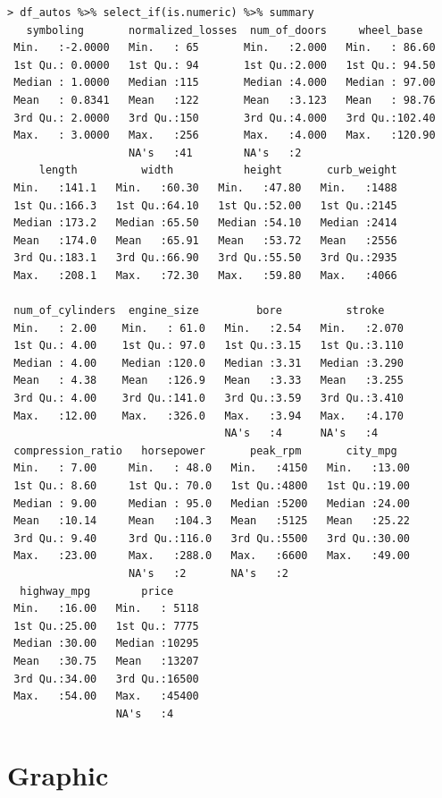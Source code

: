 \documentclass{article}
\begin{document}
\begin{lstlisting}
> df_autos %>% select_if(is.numeric) %>% summary
   symboling       normalized_losses  num_of_doors     wheel_base
 Min.   :-2.0000   Min.   : 65       Min.   :2.000   Min.   : 86.60
 1st Qu.: 0.0000   1st Qu.: 94       1st Qu.:2.000   1st Qu.: 94.50
 Median : 1.0000   Median :115       Median :4.000   Median : 97.00
 Mean   : 0.8341   Mean   :122       Mean   :3.123   Mean   : 98.76
 3rd Qu.: 2.0000   3rd Qu.:150       3rd Qu.:4.000   3rd Qu.:102.40
 Max.   : 3.0000   Max.   :256       Max.   :4.000   Max.   :120.90
                   NA's   :41        NA's   :2
     length          width           height       curb_weight
 Min.   :141.1   Min.   :60.30   Min.   :47.80   Min.   :1488
 1st Qu.:166.3   1st Qu.:64.10   1st Qu.:52.00   1st Qu.:2145
 Median :173.2   Median :65.50   Median :54.10   Median :2414
 Mean   :174.0   Mean   :65.91   Mean   :53.72   Mean   :2556
 3rd Qu.:183.1   3rd Qu.:66.90   3rd Qu.:55.50   3rd Qu.:2935
 Max.   :208.1   Max.   :72.30   Max.   :59.80   Max.   :4066

 num_of_cylinders  engine_size         bore          stroke
 Min.   : 2.00    Min.   : 61.0   Min.   :2.54   Min.   :2.070
 1st Qu.: 4.00    1st Qu.: 97.0   1st Qu.:3.15   1st Qu.:3.110
 Median : 4.00    Median :120.0   Median :3.31   Median :3.290
 Mean   : 4.38    Mean   :126.9   Mean   :3.33   Mean   :3.255
 3rd Qu.: 4.00    3rd Qu.:141.0   3rd Qu.:3.59   3rd Qu.:3.410
 Max.   :12.00    Max.   :326.0   Max.   :3.94   Max.   :4.170
                                  NA's   :4      NA's   :4
 compression_ratio   horsepower       peak_rpm       city_mpg
 Min.   : 7.00     Min.   : 48.0   Min.   :4150   Min.   :13.00
 1st Qu.: 8.60     1st Qu.: 70.0   1st Qu.:4800   1st Qu.:19.00
 Median : 9.00     Median : 95.0   Median :5200   Median :24.00
 Mean   :10.14     Mean   :104.3   Mean   :5125   Mean   :25.22
 3rd Qu.: 9.40     3rd Qu.:116.0   3rd Qu.:5500   3rd Qu.:30.00
 Max.   :23.00     Max.   :288.0   Max.   :6600   Max.   :49.00
                   NA's   :2       NA's   :2
  highway_mpg        price
 Min.   :16.00   Min.   : 5118
 1st Qu.:25.00   1st Qu.: 7775
 Median :30.00   Median :10295
 Mean   :30.75   Mean   :13207
 3rd Qu.:34.00   3rd Qu.:16500
 Max.   :54.00   Max.   :45400
                 NA's   :4
\end{lstlisting}

\newpage
\section{Graphic}
\end{document}
